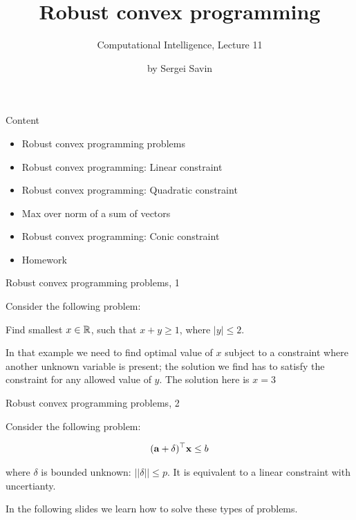 \documentclass{beamer}
\title{ Robust convex programming }
\subtitle{Computational Intelligence, Lecture 11}
\author{by Sergei Savin}
\date{\mydate}
\begin{document}
\maketitle



\begin{frame}{Content}

\begin{itemize}
 \item Robust convex programming problems
 \item Robust convex programming: Linear constraint
 \item Robust convex programming: Quadratic constraint
 \item Max over norm of a sum of vectors
 \item Robust convex programming: Conic constraint
\item Homework
\end{itemize}

\end{frame}



\begin{frame}{Robust convex programming problems, 1}
\begin{flushleft}

Consider the following problem: 

\begin{example}
Find smallest $x \in \mathbb{R}$, such that $x + y \geq 1$, where $|y| \leq 2$.
\end{example}

\bigskip

In that example we need to find optimal value of $x$ subject to a constraint where another unknown variable is present; the solution we find has to satisfy the constraint for any allowed value of $y$. The solution here is $x = 3$

 
\end{flushleft}
\end{frame}





\begin{frame}{Robust convex programming problems, 2}
	\begin{flushleft}
		
		Consider the following problem: 
		
		\begin{align}
			(\mathbf{a} + \delta)^\top \mathbf{x} \leq b
		\end{align}
		
		where $\delta$ is bounded unknown: $||\delta|| \leq p$. It is equivalent to a linear constraint with uncertianty.
		
		\bigskip
		
		In the following slides we learn how to solve these types of problems.
		
		
	\end{flushleft}
\end{frame}
\end{document}
